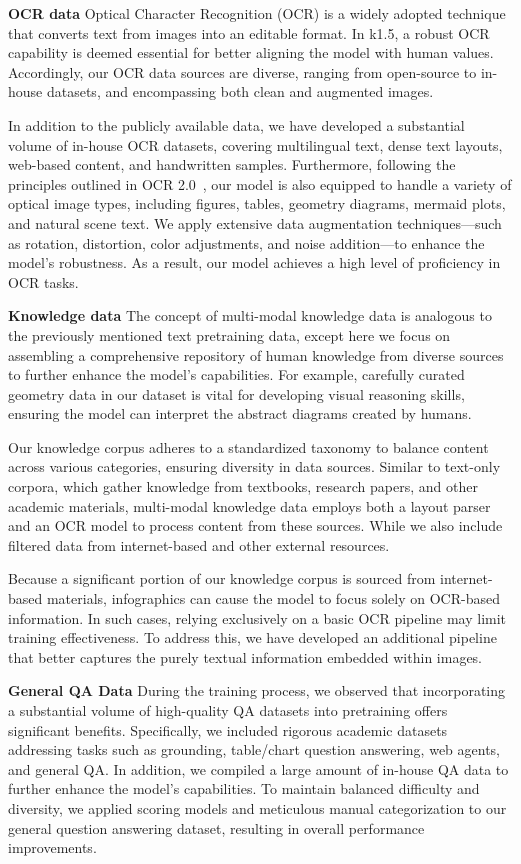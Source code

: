 \documentclass{article}
\newcommand{\citep}[1]{\parencite{#1}}
\begin{document}
\textbf{OCR data} 
Optical Character Recognition (OCR) is a widely adopted technique that converts text from images into an editable format. In k1.5, a robust OCR capability is deemed essential for better aligning the model with human values. Accordingly, our OCR data sources are diverse, ranging from open-source to in-house datasets, and encompassing both clean and augmented images.

In addition to the publicly available data, we have developed a substantial volume of in-house OCR datasets, covering multilingual text, dense text layouts, web-based content, and handwritten samples. 
Furthermore, following the principles outlined in OCR 2.0~\citep{wei2024general}, our model is also equipped to handle a variety of optical image types, including figures, tables, geometry diagrams, mermaid plots, and natural scene text. We apply extensive data augmentation techniques—such as rotation, distortion, color adjustments, and noise addition—to enhance the model’s robustness. As a result, our model achieves a high level of proficiency in OCR tasks.


\textbf{Knowledge data} The concept of multi-modal knowledge data is analogous to the previously mentioned text pretraining data, except here we focus on assembling a comprehensive repository of human knowledge from diverse sources to further enhance the model's capabilities. 
For example, carefully curated geometry data in our dataset is vital for developing visual reasoning skills, ensuring the model can interpret the abstract diagrams created by humans.

Our knowledge corpus adheres to a standardized taxonomy to balance content across various categories, ensuring diversity in data sources. Similar to text-only corpora, which gather knowledge from textbooks, research papers, and other academic materials, multi-modal knowledge data employs both a layout parser and an OCR model to process content from these sources. While we also include filtered data from internet-based and other external resources.

Because a significant portion of our knowledge corpus is sourced from internet-based materials, infographics can cause the model to focus solely on OCR-based information. In such cases, relying exclusively on a basic OCR pipeline may limit training effectiveness. To address this, we have developed an additional pipeline that better captures the purely textual information embedded within images.

\textbf{General QA Data}  
During the training process, we observed that incorporating a substantial volume of high-quality QA datasets into pretraining offers significant benefits. Specifically, we included rigorous academic datasets addressing tasks such as grounding, table/chart question answering, web agents, and general QA. In addition, we compiled a large amount of in-house QA data to further enhance the model’s capabilities. To maintain balanced difficulty and diversity, we applied scoring models and meticulous manual categorization to our general question answering dataset, resulting in overall performance improvements.
\end{document}

